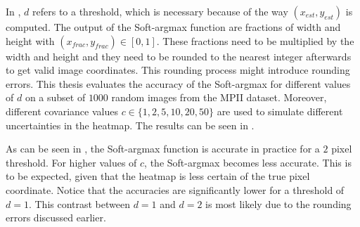 In , $d$ refers to a threshold, which is necessary because of the way $(x_{est}, y_{est})$ is computed.
The output of the Soft-argmax function are fractions of width and height with $(x_{frac}, y_{frac}) \in [0,1]$.
These fractions need to be multiplied by the width and height and they need to be rounded to the nearest integer afterwards to get valid image coordinates.
This rounding process might introduce rounding errors.
This thesis evaluates the accuracy of the Soft-argmax for different values of $d$ on a subset of $1000$ random images from the MPII dataset.
Moreover, different covariance values $c \in \{1, 2, 5, 10, 20, 50 \}$ are used to simulate different uncertainties in the heatmap.
The results can be seen in .

As can be seen in , the Soft-argmax function is accurate in practice for a $2$ pixel threshold.
For higher values of $c$, the Soft-argmax becomes less accurate.
This is to be expected, given that the heatmap is less certain of the true pixel coordinate.
Notice that the accuracies are significantly lower for a threshold of $d=1$.
This contrast between $d=1$ and $d=2$ is most likely due to the rounding errors discussed earlier.

\begin{table}[]
    \centering
    \caption{Mean average accuracy (in percent) of Soft-argmax when detecting ground truth coordinates from synthetic joint heatmaps. Threshold referrs to the amound of pixels the estimate is allowed to deviate from the ground truth annotation. $c$ referres to the covariance used for creating the synthetic heatmaps. The large discrepancy between a threshold of $1$ and a threshold of $2$ is most likely due to rounding errors.}
    \label{tab:softargmax_numeric_eval}
\end{table}


